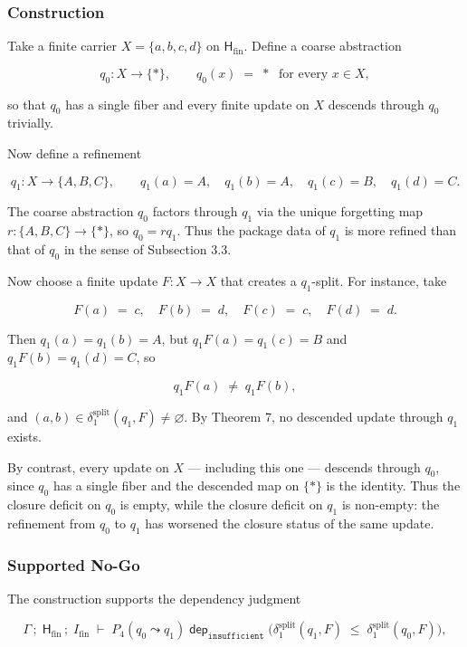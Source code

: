 \documentclass[11pt]{article}
\theoremstyle{definition}
\begin{document}
\subsubsection{Construction}

Take a finite carrier \(X=\{a,b,c,d\}\) on \(\mathsf H_{\mathrm{fin}}\). Define a coarse abstraction

\[
q_0\colon X\to\{*\},\qquad q_0(x)\;=\;*\;\text{ for every }x\in X,
\]

so that \(q_0\) has a single fiber and every finite update on \(X\) descends through \(q_0\) trivially.

Now define a refinement

\[
q_1\colon X\to\{A,B,C\},\qquad q_1(a)=A,\quad q_1(b)=A,\quad q_1(c)=B,\quad q_1(d)=C.
\]

The coarse abstraction \(q_0\) factors through \(q_1\) via the unique forgetting map \(r:\{A,B,C\}\to\{*\}\), so \(q_0=rq_1\). Thus the package data of \(q_1\) is more refined than that of \(q_0\) in the sense of Subsection 3.3.

Now choose a finite update \(F:X\to X\) that creates a \(q_1\)-split. For instance, take

\[
F(a)\;=\;c,\quad F(b)\;=\;d,\quad F(c)\;=\;c,\quad F(d)\;=\;d.
\]

Then \(q_1(a)=q_1(b)=A\), but \(q_1F(a)=q_1(c)=B\) and \(q_1F(b)=q_1(d)=C\), so

\[
q_1F(a)\;\neq\;q_1F(b),
\]

and \((a,b)\in\delta_1^{\mathrm{split}}(q_1,F)\neq\varnothing\). By Theorem 7, no descended update through \(q_1\) exists.

By contrast, every update on \(X\) --- including this one --- descends through \(q_0\), since \(q_0\) has a single fiber and the descended map on \(\{*\}\) is the identity. Thus the closure deficit on \(q_0\) is empty, while the closure deficit on \(q_1\) is non-empty: the refinement from \(q_0\) to \(q_1\) has worsened the closure status of the same update.

\subsubsection{Supported No-Go}

The construction supports the dependency judgment

\[
\Gamma\,;\;\mathsf H_{\mathrm{fin}}\,;\;I_{\mathrm{fin}}\;\vdash\;P_4(q_0\leadsto q_1)\;\mathrel{\mathsf{dep}_{\texttt{insufficient}}}\;\bigl(\delta_1^{\mathrm{split}}(q_1,F)\;\le\;\delta_1^{\mathrm{split}}(q_0,F)\bigr),
\]
\end{document}
